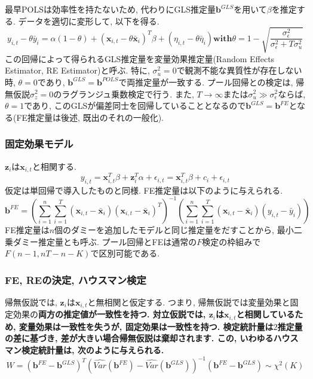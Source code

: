 \documentclass[paper=a4paper,fontsize=10pt]{jlreq}
\begin{document}
最早POLSは効率性を持たないため, 代わりにGLS推定量$\mathbf{b}^{GLS}$を用いて$\beta$を推定する. データを適切に変形して, 以下を得る.
\begin{equation*}
  y_{i,t} - \theta\bar{y}_{i}= \alpha(1-\theta) + (\mathbf{x}_{i,t} - \theta\bar{\mathbf{x}}_{i})^T \beta + (\eta_{i,t} - \theta\bar{\eta}_{i})　\mathbf{with}　\theta = 1 - \sqrt{\frac{\sigma_\epsilon^2}{\sigma_\epsilon^2 + T \sigma_u^2}}
\end{equation*}
この回帰によって得られるGLS推定量を変量効果推定量(Random Effects Estimator, RE Estimator)と呼ぶ. 特に, $\sigma_u^2 = 0$で観測不能な異質性が存在しない時, $\theta = 0$であり, $\mathbf{b}^{GLS} = \mathbf{b}^{POLS}$で両推定量が一致する. プール回帰との検定は, 帰無仮説$\sigma_z^2=0$のラグランジュ乗数検定で行う. また, $T \to \infty$または$\sigma_u^2 \gg \sigma_\epsilon^2$ならば, $\theta = 1$であり, このGLSが偏差同士を回帰していることとなるので$\mathbf{b}^{GLS} = \mathbf{b}^{FE}$となる(FE推定量は後述, 既出のそれの一般化).\\

\subsubsection{固定効果モデル}
$\mathbf{z}_i$は$\mathbf{x}_{i,t}$と相関する. 
\begin{equation*}
  y_{i,t} = \mathbf{x}_{i,t}^T \beta + \mathbf{z}_{i}^T \alpha + \epsilon_{i,t} = \mathbf{x}_{i,t}^T \beta + c_i + \epsilon_{i,t}
\end{equation*}
仮定は単回帰で導入したものと同様. FE推定量は以下のように与えられる.
\begin{equation*}
  \mathbf{b}^{FE} = (\sum_{i=1}^{n}\sum_{i=1}^{T}(\mathbf{x}_{i,t} - \bar{\mathbf{x}}_i)(\mathbf{x}_{i,t} - \bar{\mathbf{x}}_i)^T)^{-1} (\sum_{i=1}^{n}\sum_{i=1}^{T}(\mathbf{x}_{i,t} - \bar{\mathbf{x}}_i)(y_{i,t} - \bar{y}_i))
\end{equation*}
FE推定量は$n$個のダミーを追加したモデルと同じ推定量をだすことから, 最小二乗ダミー推定量とも呼ぶ. プール回帰とFEは通常の$F$検定の枠組みで$F(n - 1, nT - n - K)$で区別可能である. \\

\subsubsection{FE, REの決定, ハウスマン検定}
帰無仮説では, $\mathbf{z}_i$は$\mathbf{x}_{i,t}$と無相関と仮定する. つまり, 帰無仮説では変量効果と固定効果の\rmfamily\mcfamily\bfseries{両方の推定値が一致性を持つ}\mdseries . 対立仮説では, $\mathbf{z}_i$は$\mathbf{x}_{i,t}$と相関しているため, 変量効果は一致性を失うが, 固定効果は一致性を持つ. 検定統計量は$2$推定量の差に基づき, 差が大きい場合帰無仮説は棄却されます. この, いわゆるハウスマン検定統計量は, 次のように与えられる.
\begin{equation*}
  W = (\mathbf{b}^{FE} - \mathbf{b}^{GLS})^T(\hat{Var}(\mathbf{b}^{FE}) - \hat{Var}(\mathbf{b}^{GLS}))^{-1} (\mathbf{b}^{FE} - \mathbf{b}^{GLS}) \sim \chi^2(K)
\end{equation*}
\end{document}
